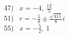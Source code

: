 \documentclass[11pt]{book}
\theoremstyle{definition}  %
\begin{document}
\begin{multicols}{2}
   47)~ $x=-4,~\frac{12}{5}$\\
   51)~ $r=-\frac{5}{8}\pm\frac{\sqrt{415}}{8}i$\\
   55)~ $x=-\frac{5}{2},~1$\\
\end{multicols}
\end{document}
